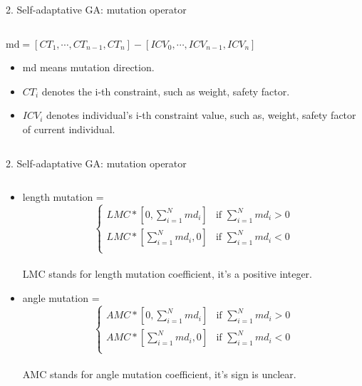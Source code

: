 \documentclass{beamer}
\begin{document}
\begin{frame}{2. Self-adaptative GA:  mutation operator}
    \begin{columns}[c]
    \begin{column}{1\textwidth}
		$\text{md} = [CT_1, \cdots, CT_{n-1}, CT_n] -  [ICV_0, \cdots, ICV_{n-1},
		ICV_n]$ \\
		\begin{itemize}
			\item  md means mutation direction.
			\item  $CT_i$ denotes the i-th constraint, such as weight, safety factor.
			\item  $ICV_i$ denotes individual's i-th constraint value, such as,  weight, safety
				factor of current individual.
		\end{itemize}

    \end{column}
\end{columns}
\end{frame}


\begin{frame}{2. Self-adaptative GA:  mutation operator}
    \begin{columns}[c]
	\begin{column}{1\textwidth}
		\begin{itemize}
			\item length mutation =  
				\[
				  \begin{cases}
					  LMC*[0, \sum_{i=1}^{N}{md_i}] & \text{if $\sum_{i=1}^{N}{md_i} > 0$} \\
					  LMC*[\sum_{i=1}^{N}{md_i}, 0] & \text{if $\sum_{i=1}^{N}{md_i} < 0$} \\
				  \end{cases}
				\] \\
				LMC stands for length mutation coefficient, it's a positive integer.
			\item angle mutation = 
				\[
				  \begin{cases}
					  AMC*[0, \sum_{i=1}^{N}{md_i}] & \text{if $\sum_{i=1}^{N}{md_i} > 0$} \\
					  AMC*[\sum_{i=1}^{N}{md_i}, 0] & \text{if $\sum_{i=1}^{N}{md_i} < 0$} \\
				  \end{cases}
				\] \\
				AMC stands for angle mutation coefficient, it's sign is unclear.
		\end{itemize}
	\end{column}
\end{columns}
\end{frame}
\end{document}
